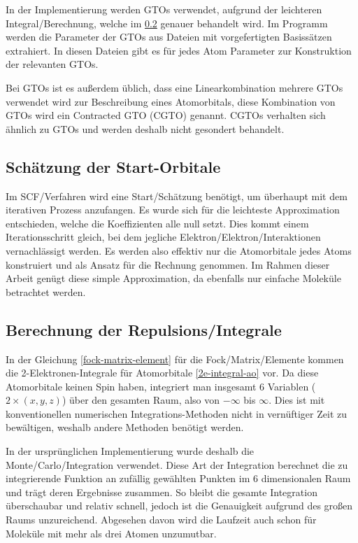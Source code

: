\begin{enumerate}
    \cite[Ab. 6.2.1]{cramer_2004}
\end{enumerate}

In der Implementierung werden GTOs verwendet, aufgrund der leichteren Integral\-/Berechnung,
welche im \cref{repulsion-integrals-section} genauer behandelt wird.
Im Programm werden die Parameter der GTOs aus Dateien mit vorgefertigten Basissätzen extrahiert.
In diesen Dateien gibt es für jedes Atom Parameter zur Konstruktion der relevanten GTOs.

Bei GTOs ist es außerdem üblich, dass eine Linearkombination mehrere GTOs verwendet wird 
zur Beschreibung eines Atomorbitals, diese Kombination von GTOs wird ein Contracted GTO (CGTO) genannt.
CGTOs verhalten sich ähnlich zu GTOs und werden deshalb nicht gesondert behandelt.
\cite[S.255-256]{lewars_2016}

\subsection{Schätzung der Start-Orbitale}
Im SCF\-/Verfahren wird eine Start\-/Schätzung benötigt, um überhaupt mit dem iterativen Prozess anzufangen.
Es wurde sich für die leichteste Approximation entschieden, welche die Koeffizienten alle null setzt.
Dies kommt einem Iterationsschritt gleich,
bei dem jegliche Elektron\-/Elektron\-/Interaktionen vernachlässigt werden.
Es werden also effektiv nur die Atomorbitale jedes Atoms konstruiert
und als Ansatz für die Rechnung genommen. Im Rahmen dieser Arbeit genügt diese simple Approximation,
da ebenfalls nur einfache Moleküle betrachtet werden.

\subsection{Berechnung der Repulsions\-/Integrale}\label{repulsion-integrals-section}
In der Gleichung \cref{fock-matrix-element} für die Fock\-/Matrix\-/Elemente kommen die
2-Elektronen-Integrale für Atomorbitale \cref{2e-integral-ao} vor.
Da diese Atomorbitale keinen Spin haben, integriert man insgesamt 6 Variablen
($2\times (x,y,z)$) über den gesamten Raum, also von $-\infty$ bis $\infty$.
Dies ist mit konventionellen numerischen Integrations-Methoden nicht in vernüftiger Zeit
zu bewältigen, weshalb andere Methoden benötigt werden.

In der ursprünglichen Implementierung wurde deshalb die Monte\-/Carlo\-/Integration verwendet.
Diese Art der Integration berechnet die zu integrierende Funktion an zufällig gewählten Punkten
im 6 dimensionalen Raum und trägt deren Ergebnisse zusammen. So bleibt die gesamte Integration
überschaubar und relativ schnell, jedoch ist die Genauigkeit aufgrund des großen Raums unzureichend.
Abgesehen davon wird die Laufzeit auch schon für Moleküle mit mehr als drei Atomen unzumutbar.

